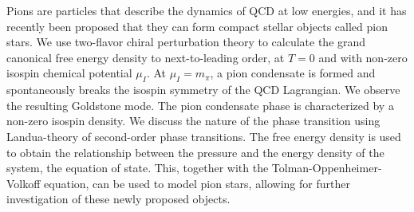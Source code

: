 Pions are particles that describe the dynamics of QCD at low energies, and it has recently been proposed that they can form compact stellar objects called pion stars.
We use two-flavor chiral perturbation theory to calculate the grand canonical free energy density to next-to-leading order, at $T = 0$ and with non-zero isospin chemical potential $\mu_I$.
At $\mu_I = m_\pi$, a pion condensate is formed and spontaneously breaks the isospin symmetry of the QCD Lagrangian.
We observe the resulting Goldstone mode.
The pion condensate phase is characterized by a non-zero isospin density.
We discuss the nature of the phase transition using Landua-theory of second-order phase transitions.
The free energy density is used to obtain the relationship between the pressure and the energy density of the system, the equation of state.
This, together with the Tolman-Oppenheimer-Volkoff equation, can be used to model pion stars, allowing for further investigation of these newly proposed objects.
